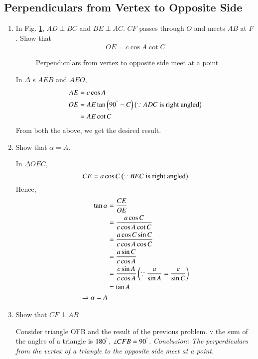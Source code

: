 \subsection{Perpendiculars from Vertex to Opposite Side}
\renewcommand{\theequation}{\theenumi}
\begin{enumerate}[label=\arabic*.,ref=\thesubsection.\theenumi]
\item
	In Fig. \ref{ch3_perp_triang}, $AD \perp BC$ and $BE \perp AC$. $CF$ passes through $O$ and meets
	$AB$ at $F$.  	
	Show that 
	\begin{align}
	OE = c \cos A \cot C
	\end{align}

	\begin{figure}[!ht]
		\begin{center}
			
			\resizebox{\columnwidth}{!}{}
		\end{center}
		\caption{Perpendiculars from vertex to opposite side meet at a point}
		\label{ch3_perp_triang}	
	\end{figure}
%
\solution In $\Delta$ s $AEB$ and $AEO$,
%
\begin{align}
AE &= c \cos A \\
OE &= AE \tan \left(90^{\degree} - C\right) \left(\because ADC \text{ is right angled}\right) \\
&= AE \cot C
\end{align}
%
From both the above, we get the desired result.
%
\item
	Show that $\alpha = A$.

\solution In $\Delta OEC$,
%
\begin{equation}
CE = a \cos C \left(\because BEC \text{ is right angled}\right)
\end{equation}
%
Hence,
%
\begin{equation}
\begin{split}
\tan \alpha &= \frac{CE}{OE} \\
&=  \frac{a \cos C}{c \cos A \cot C} \\
&=  \frac{a \cos C \sin C}{c \cos A \cos C} \\
&= \frac{a \sin C}{c \cos A } \\
&= \frac{c \sin A}{c \cos A } \left(\because \frac{a}{\sin A} = \frac{c}{\sin C}\right)\\
&= \tan A\\
\Rightarrow \alpha = A
\end{split}
\end{equation}
%
\item
	Show that $CF \perp AB$

\solution Consider triangle OFB and the result of the previous problem.  $\because$ the sum of the angles of a triangle is $180^{\degree}$, $\angle CFB = 90^{\degree}$.
{\em Conclusion: The perperdiculars from the vertex of a triangle to the opposite side meet at a point.}
\end{enumerate}
